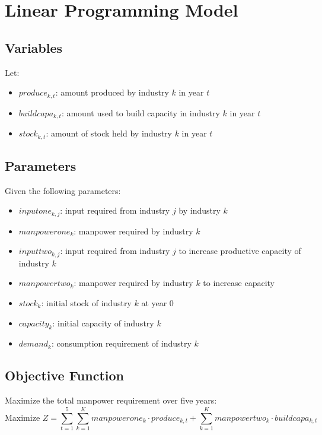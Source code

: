 \documentclass{article}
\begin{document}
\section*{Linear Programming Model}

\subsection*{Variables}
Let:
\begin{itemize}
    \item \( produce_{k,t} \): amount produced by industry \( k \) in year \( t \)
    \item \( buildcapa_{k,t} \): amount used to build capacity in industry \( k \) in year \( t \)
    \item \( stock_{k,t} \): amount of stock held by industry \( k \) in year \( t \)
\end{itemize}

\subsection*{Parameters}
Given the following parameters:
\begin{itemize}
    \item \( inputone_{k,j} \): input required from industry \( j \) by industry \( k \)
    \item \( manpowerone_{k} \): manpower required by industry \( k \)
    \item \( inputtwo_{k,j} \): input required from industry \( j \) to increase productive capacity of industry \( k \)
    \item \( manpowertwo_{k} \): manpower required by industry \( k \) to increase capacity
    \item \( stock_{k} \): initial stock of industry \( k \) at year 0
    \item \( capacity_{k} \): initial capacity of industry \( k \)
    \item \( demand_{k} \): consumption requirement of industry \( k \)
\end{itemize}

\subsection*{Objective Function}
Maximize the total manpower requirement over five years:
\[
\text{Maximize } Z = \sum_{t=1}^{5} \sum_{k=1}^{K} manpowerone_{k} \cdot produce_{k,t} + \sum_{k=1}^{K} manpowertwo_{k} \cdot buildcapa_{k,t}
\]
\end{document}
